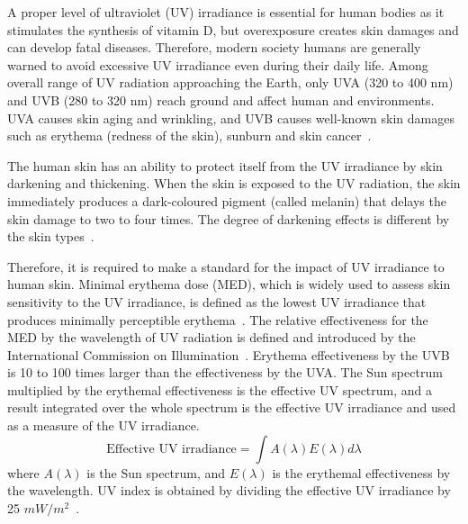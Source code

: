 \documentclass[journal]{IEEEtran}
\begin{document}
A proper level of ultraviolet (UV) irradiance is essential for human bodies as it stimulates the synthesis of vitamin D, but overexposure creates skin damages and can develop fatal diseases. Therefore, modern society humans are generally warned to avoid excessive UV irradiance even during their daily life. 
Among overall range of UV radiation approaching the Earth, only UVA (320 to 400 nm) and UVB (280 to 320 nm) reach ground and affect human and environments.
UVA causes skin aging and wrinkling, and UVB causes well-known skin damages such as erythema (redness of the skin), sunburn and skin cancer~\cite{Matsumura:TAP04}.

The human skin has an ability to protect itself from the UV irradiance by skin darkening and thickening. 
When the skin is exposed to the UV radiation, the skin immediately produces a dark-coloured pigment (called melanin) that delays the skin damage to two to four times. 
The degree of darkening effects is different by the skin types~\cite{Harrison:Method02}.


Therefore, it is required to make a standard for the impact of UV irradiance to human skin. 
Minimal erythema dose (MED), which is widely used to assess skin sensitivity to the UV irradiance, is defined as the lowest UV irradiance that produces minimally perceptible erythema~\cite{Diffey:CPPM91}. 
The relative effectiveness for the MED by the wavelength of UV radiation is defined and introduced by the International Commission on Illumination~\cite{CIE}.
Erythema effectiveness by the UVB is 10 to 100 times larger than the effectiveness by the UVA.
The Sun spectrum multiplied by the erythemal effectiveness is the effective UV spectrum, and a result integrated over the whole spectrum is the effective UV irradiance and used as a measure of the UV irradiance.
%
\begin{equation} 
\text{Effective~UV~irradiance} = \int A(\lambda)E(\lambda) d \lambda
 \end{equation}
%
where $A(\lambda)$ is the Sun spectrum, and $E(\lambda)$ is the erythemal effectiveness by the wavelength.
UV index is obtained by dividing the effective UV irradiance by 25 $mW/m^2$~\cite{CIE}.
\end{document}
